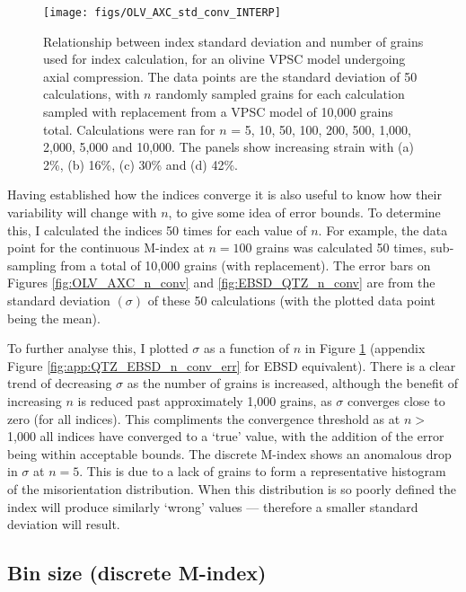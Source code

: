 \documentclass[a4paper,12pt,twoside]{report}
\numberwithin{equation}{chapter}
\begin{document}
      
\begin{figure}[h!]
  \centering
    \texttt{[image: figs/OLV\_AXC\_std\_conv\_INTERP]}
  \caption[Index error with no. grains (olivine VPSC)]{Relationship between index standard deviation and number of grains used for index calculation, for an olivine VPSC model undergoing axial compression. The data points are the standard deviation of 50 calculations, with $n$ randomly sampled grains for each calculation sampled with replacement from a VPSC model of 10,000 grains total. Calculations were ran for $n$ = 5, 10, 50, 100, 200, 500, 1,000, 2,000, 5,000 and 10,000. The panels show increasing strain with (a) 2\%, (b) 16\%, (c) 30\% and (d) 42\%.}
  \label{fig:OLV_AXC_n_conv_err}
\end{figure}


Having established how the indices converge it is also useful to know how their variability will change with $n$, to give some idea of error bounds. To determine this, I calculated the indices 50 times for each value of $n$. For example, the data point for the continuous M-index at $n = 100$ grains was calculated 50 times, sub-sampling from a total of 10,000 grains (with replacement). The error bars on Figures \ref{fig:OLV_AXC_n_conv} and \ref{fig:EBSD_QTZ_n_conv} are from the standard deviation $(\sigma)$ of these 50 calculations (with the plotted data point being the mean).

To further analyse this, I plotted $\sigma$ as a function of $n$ in Figure \ref{fig:OLV_AXC_n_conv_err} (appendix Figure \ref{fig:app:QTZ_EBSD_n_conv_err} for EBSD equivalent). There is a clear trend of decreasing $\sigma$ as the number of grains is increased, although the benefit of increasing $n$ is reduced past approximately 1,000 grains, as $\sigma$ converges close to zero (for all indices). This compliments the convergence threshold as at $n >$ 1,000 all indices have converged to a \lq{}true\rq{} value, with the addition of the error being within acceptable bounds. The discrete M-index shows an anomalous drop in $\sigma$ at $n = 5$. This is due to a lack of grains to form a representative histogram of the misorientation distribution. When this distribution is so poorly defined the index will produce similarly \lq{}wrong\rq{} values --- therefore a smaller standard deviation will result.

\subsection{Bin size (discrete M-index)} \label{sec:bin_size}
\end{document}
